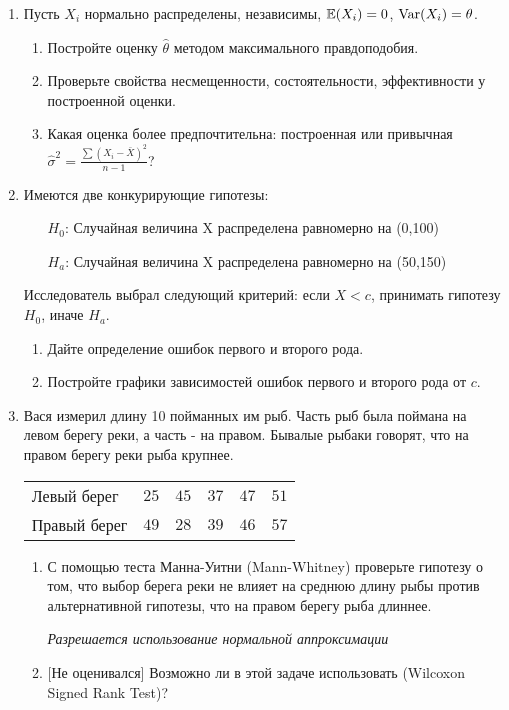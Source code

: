 \begin{enumerate}
\item Пусть $X_{i}$ нормально распределены, независимы, $\mathbb{E}(X_{i})=0$,
$\operatorname{Var}(X_{i})=\theta$.
\begin{enumerate}
\item Постройте оценку $\hat{\theta}$ методом максимального
правдоподобия.
\item Проверьте свойства несмещенности, состоятельности,
эффективности у построенной оценки.
\item Какая оценка более предпочтительна: построенная или
привычная
$\hat{\sigma}^{2}=\frac{\sum(X_{i}-\bar{X})^{2}}{n-1}$?
\end{enumerate}

\item Имеются две конкурирующие гипотезы:
\begin{enumerate}
\item[$H_0$:] Случайная величина X распределена равномерно на (0,100)
\item[$H_a$:] Случайная величина X распределена равномерно на (50,150)
\end{enumerate}
Исследователь выбрал следующий критерий: если $X<c$, принимать гипотезу $H_0$, иначе  $H_a$.
\begin{enumerate}
\item Дайте определение ошибок первого и второго рода.
\item Постройте графики зависимостей ошибок первого и второго рода от $c$.
\end{enumerate}

\item Вася измерил длину 10 пойманных им рыб. Часть рыб была поймана на
левом берегу реки, а часть - на правом. Бывалые рыбаки говорят,
что на правом берегу реки рыба крупнее.

\begin{tabular}{@{}lccccc@{}}
\toprule
Левый берег  & $25$ & $45$ & $37$ & $47$ & $51$ \\
Правый берег & $49$ & $28$ & $39$ & $46$ & $57$ \\ \bottomrule
\end{tabular}
\begin{enumerate}
\item С помощью теста Манна-Уитни (Mann-Whitney) проверьте
гипотезу о том, что выбор берега реки не влияет на среднюю длину
рыбы против
альтернативной гипотезы, что на правом берегу рыба длиннее.

\emph{Разрешается использование нормальной аппроксимации}
\item{} $[$Не оценивался$]$ Возможно ли в этой задаче использовать
(Wilcoxon Signed Rank Test)?
\end{enumerate}
\end{enumerate}


